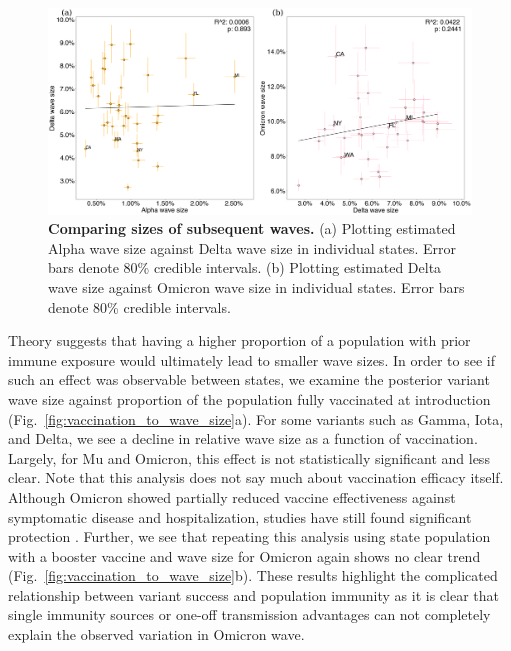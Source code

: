 \documentclass[11pt,oneside,letterpaper]{article}
\def\tbc#1{\textcolor{purple}{[#1]}}
\def\mfc#1{\textcolor{brown}{[#1]}}
\begin{document}

\begin{figure}[h!]
  \centering
  \includegraphics[width=\linewidth]{figs/wave_size_to_wave_size.png}
  \caption{\textbf{Comparing sizes of subsequent waves.}
    (a) Plotting estimated Alpha wave size against Delta wave size in individual states. Error bars denote 80\% credible intervals.
    (b) Plotting estimated Delta wave size against Omicron wave size in individual states. Error bars denote 80\% credible intervals.
  }
  \label{fig:wave_size_to_wave_size}
\end{figure}

Theory suggests that having a higher proportion of a population with prior immune exposure would ultimately lead to smaller wave sizes.
In order to see if such an effect was observable between states, we examine the posterior variant wave size against proportion of the population fully vaccinated at introduction (Fig.\ \ref{fig:vaccination_to_wave_size}a).
For some variants such as Gamma, Iota, and Delta, we see a decline in relative wave size as a function of vaccination.
Largely, for Mu and Omicron, this effect is not statistically significant and less clear.
Note that this analysis does not say much about vaccination efficacy itself.
Although Omicron showed partially reduced vaccine effectiveness against symptomatic disease and hospitalization, studies have still found significant protection \cite{Kirsebom2022}.
Further, we see that repeating this analysis using state population with a booster vaccine and wave size for Omicron again shows no clear trend (Fig.\ \ref{fig:vaccination_to_wave_size}b).
These results highlight the complicated relationship between variant success and population immunity as it is clear that single immunity sources or one-off transmission advantages can not completely explain the observed variation in Omicron wave.
\end{document}
